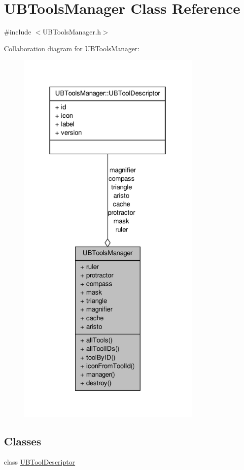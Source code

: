 \hypertarget{class_u_b_tools_manager}{\section{U\-B\-Tools\-Manager Class Reference}
\label{df/d8e/class_u_b_tools_manager}
}


{\ttfamily \#include $<$U\-B\-Tools\-Manager.\-h$>$}



Collaboration diagram for U\-B\-Tools\-Manager\-:
\nopagebreak
\begin{figure}[H]
\begin{center}
\leavevmode
\includegraphics[width=256pt]{d5/db0/class_u_b_tools_manager__coll__graph}
\end{center}
\end{figure}
\subsection*{Classes}
\begin{DoxyCompactItemize}
\item 
class \hyperlink{class_u_b_tools_manager_1_1_u_b_tool_descriptor}{U\-B\-Tool\-Descriptor}
\end{DoxyCompactItemize}
